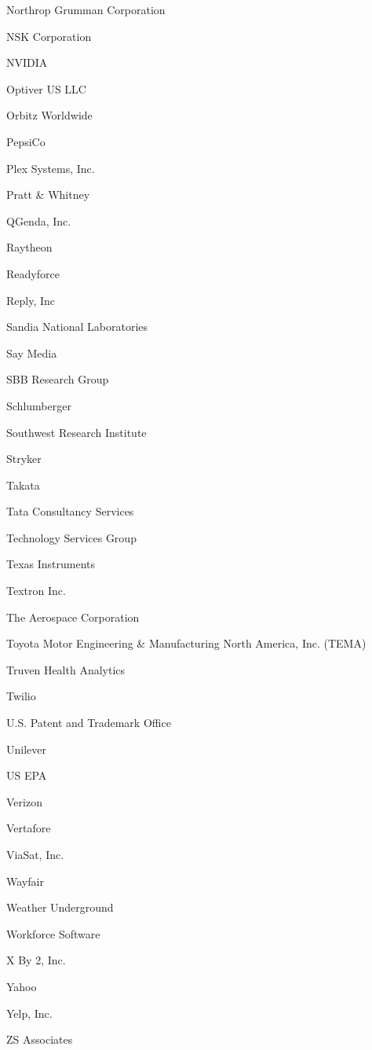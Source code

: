 \documentclass[twoside]{article}
\begin{document}
\begin{center}
\begin{multicols}{5}
\begin{FlushLeft}
\begin{compactitem}
\item Northrop Grumman Corporation
\item NSK Corporation
\item NVIDIA
\item Optiver US LLC
\item Orbitz Worldwide
\item PepsiCo
\item Plex Systems, Inc.
\item Pratt \& Whitney
\item QGenda, Inc.
\item Raytheon
\item Readyforce
\item Reply, Inc
\item Sandia National Laboratories
\item Say Media
\item SBB Research Group
\item Schlumberger
\item Southwest Research Institute
\item Stryker
\item Takata
\item Tata Consultancy Services
\item Technology Services Group
\item Texas Instruments
\item Textron Inc.
\item The Aerospace Corporation
\item Toyota Motor Engineering \& Manufacturing North America, Inc. (TEMA)
\item Truven Health Analytics
\item Twilio
\item U.S. Patent and Trademark Office
\item Unilever
\item US EPA
\item Verizon
\item Vertafore
\item ViaSat, Inc.
\item Wayfair
\item Weather Underground
\item Workforce Software
\item X By 2, Inc.
\item Yahoo
\item Yelp, Inc.
\item ZS Associates
\end{compactitem}
        \end{FlushLeft}

\end{multicols}
\end{center}
\end{document}
